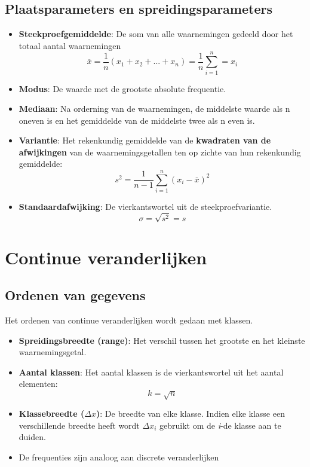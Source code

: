 \documentclass[12pt]{report}
\begin{document}
\subsection{Plaatsparameters en spreidingsparameters}
\begin{itemize}
	\item {\textbf{Steekproefgemiddelde}: De som van alle waarnemingen gedeeld door het totaal aantal waarnemingen
		$$\overline{x} = \frac{1}{n}(x_1 + x_2 + ... + x_n) = \frac{1}{n} \sum_{i = 1}^{n} = x_i$$
	}
	\item {\textbf{Modus}: De waarde met de grootste absolute frequentie.}
	\item {\textbf{Mediaan}: Na orderning van de waarnemingen, de middelste waarde als n oneven is en het gemiddelde van de middelste twee als n even is.}
	\item {\textbf{Variantie}: Het rekenkundig gemiddelde van de \textbf{kwadraten van de afwijkingen} van de waarnemingsgetallen ten op zichte van hun rekenkundig gemiddelde:
		$$s^2 = \frac{1}{n - 1}\sum_{i=1}^{n}(x_i - \overline{x})^2$$}
	\item {\textbf{Standaardafwijking}: De vierkantswortel uit de steekproefvariantie. 
		$$\sigma = \sqrt{s^2} = s$$}
\end{itemize}
\section{Continue veranderlijken}
\subsection{Ordenen van gegevens}
Het ordenen van continue veranderlijken wordt gedaan met klassen.
\begin{itemize}
	\item {\textbf{Spreidingsbreedte (range)}: Het verschil tussen het grootste en het kleinste waarnemingsgetal.}
	\item {\textbf{Aantal klassen}: Het aantal klassen is de vierkantswortel uit het aantal elementen: $$k = \sqrt{n}$$}
	\item {\textbf{Klassebreedte ($\Delta x$)}: De breedte van elke klasse. Indien elke klasse een verschillende breedte heeft wordt $\Delta x_i$ gebruikt om de \textit{i}-de klasse aan te duiden.}
	\item {De frequenties zijn analoog aan discrete veranderlijken}
\end{itemize}
\end{document}
